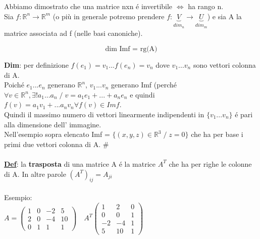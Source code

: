\documentclass[12pt]{article}
\begin{document}
\noindent Abbiamo dimostrato che una matrice nxn é invertibile $\iff$ ha rango n.\\
Sia $f: \mathbb{R}^n \longrightarrow \mathbb{R}^m$ (o più in generale potremo prendere 
$f:\underbrace{V}_{dim_n}  \longrightarrow \underbrace{U}_{dim_m}$) e sia A la matrice associata ad f (nelle basi canoniche).
\begin{theorem}
    $$\text{dim Imf = rg(A)}$$
    \label{rango e dimensione immagine di f}
\end{theorem}
\textbf{Dim}: per definizione $f(e_1) = v_1...f(e_n)=v_n$ dove $v_1...v_n$ sono vettori colonna di A.\\
Poiché $e_1...e_n$ generano $\mathbb{R}^n$, $v_1...v_n$ generano Imf (perché $\forall v \in \mathbb{R}^n, \exists! a_1...a_n \;/\; v = a_1e_1+...+a_ne_n$ e quindi $f(v) = a_1v_1+...a_nv_n \forall f(v) \in Imf$.\\
Quindi il massimo numero di vettori linearmente indipendenti in $\{v_1...v_n\}$ é pari alla dimensione dell' immagine.\\
Nell'esempio sopra elencato Imf = $\{(x,y,z) \in \mathbb{R}^3 \;/\; z = 0\}$ che ha per base i primi due vettori colonna di A. \#\\\\
\underline{\textbf{Def}}: la \textbf{trasposta} di una matrice A é la matrice $A^T$ che ha per righe le colonne di A. In altre parole $(A^T)_{ij} = A_{ji}$\\\\
Esempio:\\
$A = \begin{pmatrix}
    1 & 0 & -2 & 5\\
    2 & 0 & -4 & 10\\
    0 & 1 & 1 & 1 
\end{pmatrix}
\quad A^T\begin{pmatrix}
    1 & 2 & 0\\
    0 & 0 & 1\\
    -2 & -4 & 1\\
    5 & 10 & 1
\end{pmatrix}
$
\\\\
\end{document}

